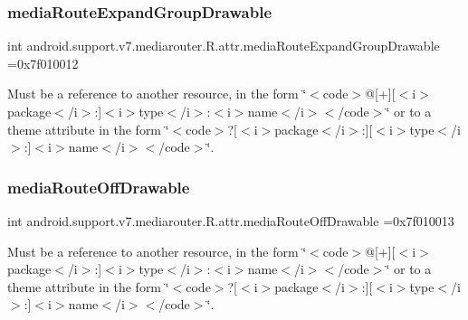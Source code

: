\subsubsection{\texorpdfstring{media\+Route\+Expand\+Group\+Drawable}{mediaRouteExpandGroupDrawable}}
{\footnotesize\ttfamily int android.\+support.\+v7.\+mediarouter.\+R.\+attr.\+media\+Route\+Expand\+Group\+Drawable =0x7f010012\hspace{0.3cm}{\ttfamily [static]}}

Must be a reference to another resource, in the form \char`\"{}$<$code$>$@\mbox{[}+\mbox{]}\mbox{[}$<$i$>$package$<$/i$>$\+:\mbox{]}$<$i$>$type$<$/i$>$\+:$<$i$>$name$<$/i$>$$<$/code$>$\char`\"{} or to a theme attribute in the form \char`\"{}$<$code$>$?\mbox{[}$<$i$>$package$<$/i$>$\+:\mbox{]}\mbox{[}$<$i$>$type$<$/i$>$\+:\mbox{]}$<$i$>$name$<$/i$>$$<$/code$>$\char`\"{}. \mbox{\label{classandroid_1_1support_1_1v7_1_1mediarouter_1_1R_1_1attr_ac9789262a47a7752080a9fb4574c4ede}} 
\subsubsection{\texorpdfstring{media\+Route\+Off\+Drawable}{mediaRouteOffDrawable}}
{\footnotesize\ttfamily int android.\+support.\+v7.\+mediarouter.\+R.\+attr.\+media\+Route\+Off\+Drawable =0x7f010013\hspace{0.3cm}{\ttfamily [static]}}

Must be a reference to another resource, in the form \char`\"{}$<$code$>$@\mbox{[}+\mbox{]}\mbox{[}$<$i$>$package$<$/i$>$\+:\mbox{]}$<$i$>$type$<$/i$>$\+:$<$i$>$name$<$/i$>$$<$/code$>$\char`\"{} or to a theme attribute in the form \char`\"{}$<$code$>$?\mbox{[}$<$i$>$package$<$/i$>$\+:\mbox{]}\mbox{[}$<$i$>$type$<$/i$>$\+:\mbox{]}$<$i$>$name$<$/i$>$$<$/code$>$\char`\"{}. \mbox{\label{classandroid_1_1support_1_1v7_1_1mediarouter_1_1R_1_1attr_a37116eabdcf3dce114f58601d0176f0d}} 
